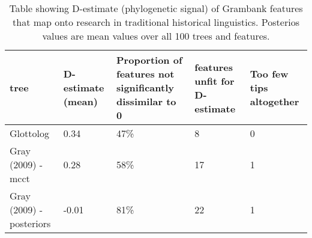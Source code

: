 \begin{table}[ht]
\centering
\begin{tabular}{p{4.5cm}p{2.2cm}p{2.2cm}p{2.2cm}p{2.2cm}}
  \hline
tree & D-estimate (mean) & Proportion of features not significantly dissimilar to 0 & features unfit for D-estimate & Too few tips altogether \\ 
  \hline
Glottolog & 0.34 & 47\% & 8 & 0 \\ 
  Gray (2009) - mcct & 0.28 & 58\% & 17 & 1 \\ 
  Gray (2009) - posteriors & -0.01 & 81\% & 22 & 1 \\ 
   \hline
\end{tabular}
\caption{Table showing D-estimate (phylogenetic signal) of Grambank features that map onto research in traditional historical linguistics. Posterios values are mean values over all 100 trees and features.} 
\label{d_estimate_summary}
\end{table}
